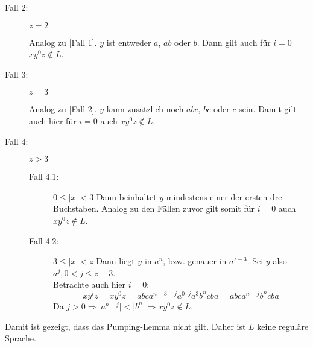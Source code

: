\documentclass[11pt]{article}
\begin{document}
\begin{enumerate}[label=\alph*)]
\begin{description}
\item[Fall 2:] $z=2$\par\nobreak
Analog zu [Fall 1]. $y$ ist entweder $a$, $ab$ oder $b$. Dann gilt auch für $i=0$ $xy^0z\not\in L$.
\item[Fall 3:] $z=3$\par\nobreak
Analog zu [Fall 2]. $y$ kann zusätzlich noch $abc$, $bc$ oder $c$ sein. Damit gilt auch hier für $i=0$ auch $xy^0z\not\in L$.
\item[Fall 4:] $z>3$\par\nobreak
\begin{description}
\item[Fall 4.1:] $0\leq \vert x \vert < 3$
Dann beinhaltet $y$ mindestens einer der ersten drei Buchstaben. Analog zu den Fällen zuvor gilt somit für $i=0$ auch $xy^0z\not\in L$.
\item[Fall 4.2:] $3\leq \vert x \vert < z$
Dann liegt $y$ in $a^n$, bzw. genauer in $a^{z-3}$. Sei $y$ also $a^j, 0<j\leq z-3$.\\
Betrachte auch hier $i=0$:
\[xy^iz=xy^0z=abca^{n-3-j}a^{0\cdot j}a^3b^ncba=abca^{n-j}b^ncba\]
Da $j>0 \Rightarrow \vert a^{n-j} \vert < \vert b^n \vert \Rightarrow xy^0z \not\in L$.
\end{description}
\end{description}
Damit ist gezeigt, dass das Pumping-Lemma nicht gilt. Daher ist $L$ keine reguläre Sprache.
\end{enumerate}
\end{document}
